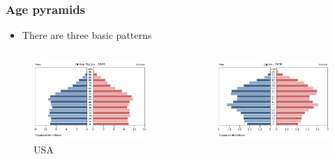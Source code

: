 \begin{frame}[t]
    \frametitle{Age pyramids}
    \begin{adjustwidth}{-2em}{-1.5em}
        \begin{itemize}
            \item There are three basic patterns
        \end{itemize}

    \begin{columns}
            \begin{figure}
                \includegraphics[width=1\columnwidth]{../images/pop-pyramid-usa-2009.png}
                \caption{\large USA}
            \end{figure}
            \begin{figure}
                \includegraphics[width=1\columnwidth]{../images/pop-pyramid-japan-2009.png}

\end{figure}
\end{columns}
\end{adjustwidth}
\end{frame}
